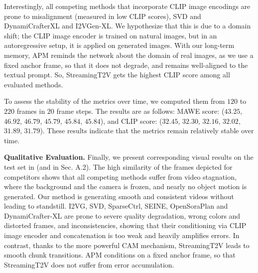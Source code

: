 Interestingly, all competing methods that incorporate CLIP image encodings are prone to misalignment (measured in low CLIP scores), \ie SVD and DynamiCrafterXL and I2VGen-XL.
%
We hypothesize that this is due to a domain shift; the  CLIP image encoder is trained on natural images, but in an autoregressive setup, it is applied on generated images.  With our long-term memory, APM  reminds the network about the domain of real images, as we use a fixed anchor frame, so that it does not degrade, and remains well-aligned to the textual prompt. So, StreamingT2V gets the highest CLIP score among all evaluated methods.


To assess the stability of the metrics over time, we computed them from $120$ to $220$ frames in $20$ frame steps. The results are as follows: MAWE score: 
($43.25$, $46.92$, $46.79$, $45.79$, $45.84$, $45.84$), and CLIP score: ($32.45$, $32.30$, $32.16$, $32.02$, $31.89$, $31.79$). These results indicate that the metrics remain relatively stable over time.


\noindent\textbf{Qualitative Evaluation.} 
Finally, we present corresponding visual results on the test set in  (and in 
Sec. \textcolor{linkblue}{A.2}). 
The high similarity of the frames depicted for competitors shows that all competing methods suffer from video stagnation, where the background and the camera is frozen, and nearly no object motion is generated. Our method is generating smooth and consistent videos without leading to standstill. 
%
I2VG, SVD, SparseCtrl, SEINE, OpenSoraPlan and DynamiCrafter-XL are prone to severe quality degradation, \eg wrong colors and distorted frames, and inconsistencies, showing that their conditioning via CLIP image encoder and concatenation is too weak and heavily amplifies errors. 
In contrast, thanks to the more powerful  CAM mechanism, StreamingT2V leads to smooth chunk transitions. APM conditions on a fixed anchor frame, so that StreamingT2V does not suffer from error accumulation. 

    
